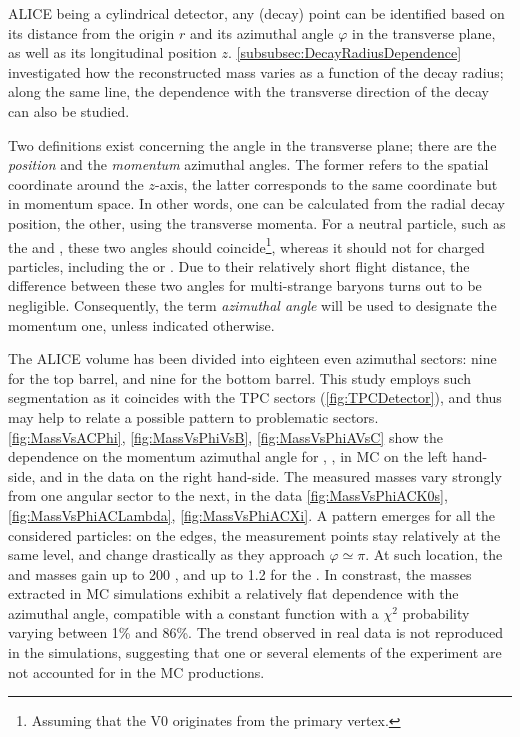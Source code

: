 ALICE being a cylindrical detector, any (decay) point can be identified based on its distance from the origin $r$ and its azimuthal angle $\varphi$ in the transverse plane, as well as its longitudinal position $z$. \Sec\ref{subsubsec:DecayRadiusDependence} investigated how the reconstructed mass varies as a function of the decay radius; along the same line, the dependence with the transverse direction of the decay can also be studied.

Two definitions exist concerning the angle in the transverse plane; there are the \textit{position} and the \textit{momentum} azimuthal angles. The former refers to the spatial coordinate around the $z$-axis, the latter corresponds to the same coordinate but in momentum space. In other words, one can be calculated from the radial decay position, the other, using the transverse momenta. For a neutral particle, such as the \rmKzeroS and \rmLambda, these two angles should coincide\footnote{Assuming that the V0 originates from the primary vertex.}, whereas it should not for charged particles, including the \rmXi or \rmOmega. Due to their relatively short flight distance, the difference between these two angles for multi-strange baryons turns out to be negligible. Consequently, the term \textit{azimuthal angle} will be used to designate the momentum one, unless indicated otherwise.

The ALICE volume has been divided into eighteen even azimuthal sectors: nine for the top barrel, and nine for the bottom barrel. This study employs such segmentation as it coincides with the TPC sectors (\fig\ref{fig:TPCDetector}), and thus may help to relate a possible pattern to problematic sectors.\\

\Figs\ref{fig:MassVsACPhi}, \ref{fig:MassVsPhiVsB}, \ref{fig:MassVsPhiAVsC} show the dependence on the momentum azimuthal angle for \rmKzeroS, \rmLambda, \rmXi in MC on the left hand-side, and in the data on the right hand-side. The measured masses vary strongly from one angular sector to the next, in the data \figs\ref{fig:MassVsPhiACK0s}, \ref{fig:MassVsPhiACLambda}, \ref{fig:MassVsPhiACXi}. A pattern emerges for all the considered particles: on the edges, the measurement points stay relatively at the same level, and change drastically as they approach $\varphi \simeq \pi$. At such location, the \rmLambda and \rmXi masses gain up to 200 \kmass, and up to 1.2 \mmass for the \rmKzeroS. In constrast, the masses extracted in MC simulations exhibit a relatively flat dependence with the azimuthal angle, compatible with a constant function with a $\chi^{2}$ probability varying between 1\% and 86\%. The trend observed in real data is not reproduced in the simulations, suggesting that one or several elements of the experiment are not accounted for in the MC productions.

